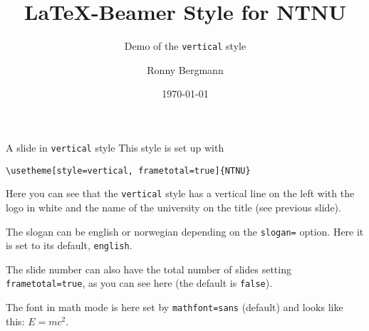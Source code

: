 \documentclass[aspectratio=169]{beamer}
\title{\LaTeX{}-Beamer Style for NTNU}
\subtitle{Demo of the  \texttt{vertical} style}
\author{Ronny Bergmann}
\date{\today}
\begin{document}
	\maketitle
		\begin{frame}[fragile]{A slide in \texttt{vertical} style}
			This style is set up with

			\lstinline!\usetheme[style=vertical, frametotal=true]{NTNU}!

			Here you can see that the \texttt{vertical} style has a vertical line on the left with the logo in white and the name of the university on the title (see previous slide).

			The slogan can be english or norwegian depending on the \lstinline!slogan=! option. Here it is set to its default, \lstinline!english!.

			The slide number can also have the total number of slides setting \lstinline!frametotal=true!,
            as you can see here (the default is \lstinline!false!).
            
            The font in math mode is here set by \lstinline!mathfont=sans! (default) and looks like this: $E=mc^2$.
		\end{frame}
\end{document}
